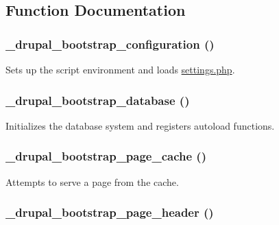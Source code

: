 \subsection{Function Documentation}
\hypertarget{bootstrap_8inc_ad6a32cc1a865d168128b5a16ce8630d9}{
\subsubsection[{\_\-drupal\_\-bootstrap\_\-configuration}]{\setlength{\rightskip}{0pt plus 5cm}\_\-drupal\_\-bootstrap\_\-configuration ()}}
\label{bootstrap_8inc_ad6a32cc1a865d168128b5a16ce8630d9}
Sets up the script environment and loads \hyperlink{settings_8php}{settings.php}. \hypertarget{bootstrap_8inc_accb161e8cea2fd1fdfece6d6f087e195}{
\subsubsection[{\_\-drupal\_\-bootstrap\_\-database}]{\setlength{\rightskip}{0pt plus 5cm}\_\-drupal\_\-bootstrap\_\-database ()}}
\label{bootstrap_8inc_accb161e8cea2fd1fdfece6d6f087e195}
Initializes the database system and registers autoload functions. \hypertarget{bootstrap_8inc_a18e86c70c220ef294a9aaa5bdc756bce}{
\subsubsection[{\_\-drupal\_\-bootstrap\_\-page\_\-cache}]{\setlength{\rightskip}{0pt plus 5cm}\_\-drupal\_\-bootstrap\_\-page\_\-cache ()}}
\label{bootstrap_8inc_a18e86c70c220ef294a9aaa5bdc756bce}
Attempts to serve a page from the cache. \hypertarget{bootstrap_8inc_aaec7ee804d0de51e5632a28a286578aa}{
\subsubsection[{\_\-drupal\_\-bootstrap\_\-page\_\-header}]{\setlength{\rightskip}{0pt plus 5cm}\_\-drupal\_\-bootstrap\_\-page\_\-header ()}}
